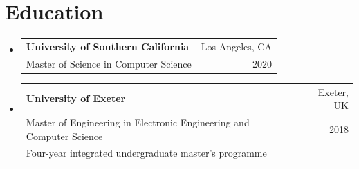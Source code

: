 \documentclass[letterpaper,9pt]{extarticle}
\makeatletter
\newcommand{\spell}[2]{#2}
\newcommand{\spell}[2]{#1}
\newcommand{\resumeSubheading}[4]{%
  \item
    \begin{tabular*}{\textwidth}[t]{l@{\extracolsep{\fill}}r}
      \textbf{#1} & #2 \\
      {\small #3} & {\small #4}
    \end{tabular*}%
}
\newcommand{\resumeSubheadingBig}[6]{%
  \item
    \begin{tabular*}{\textwidth}[t]{l@{\extracolsep{\fill}}r}
      \textbf{#1} & #2 \\
      {\small #3} & {\small #4} \\
      {\small #5} & {\small #6}
    \end{tabular*}%
}
\newcommand{\resumeSubHeadingListStart}{%
  \begin{itemize}[leftmargin=0pt,labelsep=0pt,itemsep=5pt,parsep=0pt,%
                  topsep=3pt,partopsep=0pt]}
\newcommand{\resumeSubHeadingListEnd}{\end{itemize}}
\makeatother
\begin{document}

\section{Education}
\resumeSubHeadingListStart

  \resumeSubheading
    {University of Southern California}{Los Angeles, CA}
    {Master of Science in Computer Science}{2020}

  \resumeSubheadingBig
    {University of Exeter}{Exeter, UK}
    {Master of Engineering in Electronic Engineering and Computer Science}{2018}
    {Four-year integrated undergraduate master's \spell{program}{programme}}{}
\resumeSubHeadingListEnd
\end{document}
